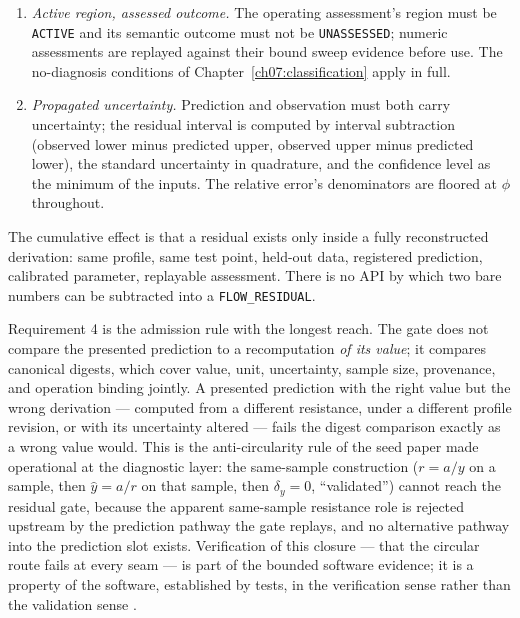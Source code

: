 \begin{ruleenv}
\begin{enumerate}
forecloses the circular construction $r = a/y$, $\hat y = a/r$,
$\delta_y = 0$, ``validated.''
\item \emph{Active region, assessed outcome.} The operating assessment's
region must be \texttt{ACTIVE} and its semantic outcome must not be
\texttt{UNASSESSED}; numeric assessments are replayed against their
bound sweep evidence before use. The no-diagnosis conditions of
Chapter~\ref{ch07:classification} apply in full.
\item \emph{Propagated uncertainty.} Prediction and observation must
both carry uncertainty; the residual interval is computed by interval
subtraction (observed lower minus predicted upper, observed upper minus
predicted lower), the standard uncertainty in quadrature, and the
confidence level as the minimum of the inputs. The relative error's
denominators are floored at $\phi$ throughout.
\end{enumerate}
\end{ruleenv}

The cumulative effect is that a residual exists only inside a fully
reconstructed derivation: same profile, same test point, held-out data,
registered prediction, calibrated parameter, replayable assessment. There
is no API by which two bare numbers can be subtracted into a
\texttt{FLOW\_RESIDUAL}.

Requirement 4 is the
admission rule with the longest reach. The gate does not compare the
presented prediction to a recomputation \emph{of its value}; it compares
canonical digests, which cover value, unit, uncertainty, sample size,
provenance, and operation binding jointly. A presented prediction with
the right value but the wrong derivation --- computed from a different
resistance, under a different profile revision, or with its uncertainty
altered --- fails the digest comparison exactly as a wrong value would.
This is the anti-circularity rule of the seed paper made operational at
the diagnostic layer: the same-sample construction ($r = a/y$ on a
sample, then $\hat y = a/r$ on that sample, then $\delta_y = 0$,
``validated'') cannot reach the residual gate, because the apparent
same-sample resistance role is rejected upstream by the prediction
pathway the gate replays, and no alternative pathway into the
prediction slot exists. Verification of this closure --- that the
circular route fails at every seam --- is part of the bounded software
evidence; it is a property of the software, established by tests, in the
verification sense rather than the validation sense \cite{sargent}.

